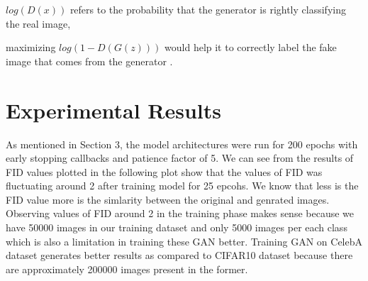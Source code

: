 \documentclass{article}
\begin{document}
$log(D(x))$ refers to the probability that the generator is rightly classifying the real image, 

maximizing $log(1-D(G(z)))$ would help it to correctly label the fake image that comes from the generator \cite{Jason1}. 

 

\section{Experimental Results}
As mentioned in Section 3, the model architectures were run for 200 epochs with early stopping callbacks and patience factor of 5. We can see from the results of FID values plotted in the following plot show that the values of FID was fluctuating around 2 after training model for 25 epcohs. We know that less is the FID value more is the simlarity between the original and genrated images. Observing values of FID around 2 in the training phase makes sense because we have 50000 images in our training dataset and only 5000 images per each class which is also a limitation in training these GAN better. Training GAN on CelebA dataset generates better results as compared to CIFAR10 dataset because there are approximately 200000 images present in the former.  
\end{document}

